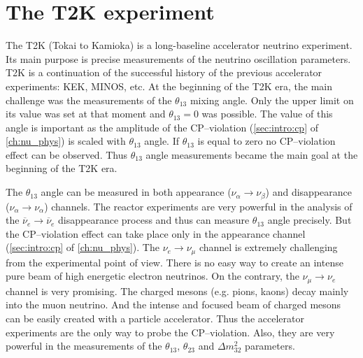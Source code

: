 \documentclass[../main.tex]{subfiles}
\begin{document}
\renewcommand{\labelitemi}{\ding{226}}
\renewcommand{\labelitemii}{\ding{227}}

\chapter{The T2K experiment}
\label{ch:T2K:general}

The T2K (Tokai to Kamioka) is a long-baseline accelerator neutrino experiment. Its main purpose is precise measurements of the neutrino oscillation parameters. T2K is a continuation of the successful history of the previous accelerator experiments: KEK, MINOS, etc. At the beginning of the T2K era, the main challenge was the measurements of the $\theta_{13}$ mixing angle. Only the upper limit on its value was set at that moment and $\theta_{13}=0$ was possible. The value of this angle is important as the amplitude of the CP--violation (\autoref{sec:intro:cp} of \autoref{ch:nu_phys}) is scaled with $\theta_{13}$ angle. If $\theta_{13}$ is equal to zero no CP--violation effect can be observed. Thus $\theta_{13}$ angle measurements became the main goal at the beginning of the T2K era.

The $\theta_{13}$ angle can be measured in both appearance ($\nu_\alpha\to\nu_\beta$) and disappearance ($\nu_\alpha\to\nu_\alpha$) channels. The reactor experiments are very powerful in the analysis of the $\overline{\nu}_e\to\overline{\nu}_e$ disappearance process and thus can measure $\theta_{13}$ angle precisely. But the CP--violation effect can take place only in the appearance channel (\autoref{sec:intro:cp} of \autoref{ch:nu_phys}). The $\nu_e\to\nu_\mu$ channel is extremely challenging from the experimental point of view. There is no easy way to create an intense pure beam of high energetic electron neutrinos. On the contrary, the $\nu_\mu\to\nu_e$ channel is very promising. The charged mesons (e.g. pions, kaons) decay mainly into the muon neutrino. And the intense and focused beam of charged mesons can be easily created with a particle accelerator. Thus the accelerator experiments are the only way to probe the CP--violation. Also, they are very powerful in the measurements of the $\theta_{13}$, $\theta_{23}$ and $\Delta m^2_{32}$ parameters.
\end{document}
